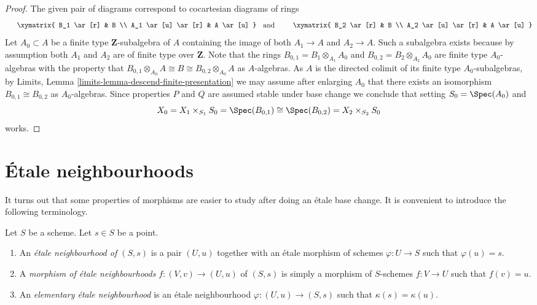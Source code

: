 \begin{proof}
The given pair of diagrams correspond to cocartesian diagrams of rings
$$
\vcenter{
\xymatrix{
B_1 \ar[r] & B \\
A_1 \ar[u] \ar[r] & A \ar[u]
}
}
\quad\text{and}\quad
\vcenter{
\xymatrix{
B_2 \ar[r] & B \\
A_2 \ar[u] \ar[r] & A \ar[u]
}
}
$$
Let $A_0 \subset A$ be a finite type $\mathbf{Z}$-subalgebra of $A$
containing the image of both $A_1 \to A$ and $A_2 \to A$. Such a subalgebra
exists because by assumption both $A_1$ and $A_2$ are of finite type over
$\mathbf{Z}$. Note that the rings $B_{0, 1} = B_1 \otimes_{A_1} A_0$
and $B_{0, 2} = B_2 \otimes_{A_2} A_0$ are finite type $A_0$-algebras
with the property that
$B_{0, 1} \otimes_{A_0} A \cong B \cong B_{0, 2} \otimes_{A_0} A$
as $A$-algebras. As $A$ is the directed colimit of its finite type
$A_0$-subalgebras, by
Limits, Lemma \ref{limits-lemma-descend-finite-presentation}
we may assume after enlarging $A_0$ that there exists an isomorphism
$B_{0, 1} \cong B_{0, 2}$ as $A_0$-algebras. Since properties $P$ and $Q$
are assumed stable under base change we conclude that setting
$S_0 = \Spec(A_0)$ and
$$
X_0 = X_1 \times_{S_1} S_0 =
\Spec(B_{0, 1}) \cong \Spec(B_{0, 2}) = X_2 \times_{S_2} S_0
$$
works.
\end{proof}












\section{\'Etale neighbourhoods}
\label{section-etale-neighbourhoods}

\noindent
It turns out that some properties of morphisms are easier to study
after doing an \'etale base change. It is convenient to introduce the
following terminology.

\begin{definition}
\label{definition-etale-neighbourhood}
Let $S$ be a scheme. Let $s \in S$ be a point.
\begin{enumerate}
\item An {\it \'etale neighbourhood of $(S, s)$} is a
pair $(U, u)$ together with an \'etale morphism
of schemes $\varphi : U \to S$ such that $\varphi(u) = s$.
\item A {\it morphism of \'etale neighbourhoods} $f : (V, v) \to (U, u)$
of $(S, s)$ is simply a morphism of $S$-schemes $f : V \to U$ such
that $f(v) = u$.
\item An {\it elementary \'etale neighbourhood} is an \'etale neighbourhood
$\varphi : (U, u) \to (S, s)$ such that $\kappa(s) = \kappa(u)$.
\end{enumerate}
\end{definition}

